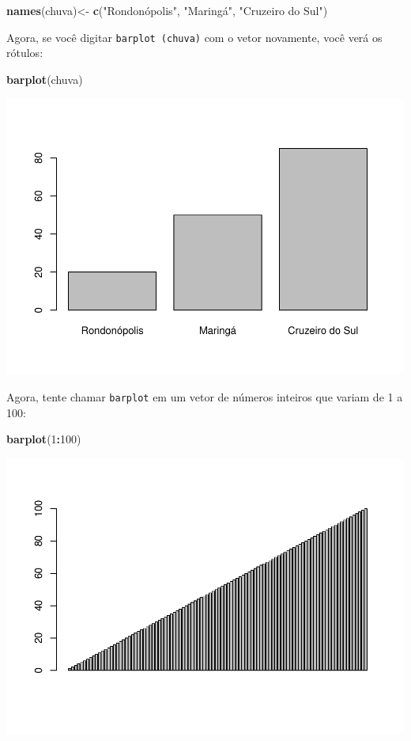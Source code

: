 \documentclass[
]{book}
\newenvironment{Shaded}{\begin{snugshade}}{\end{snugshade}}
\newcommand{\DecValTok}[1]{\textcolor[rgb]{0.00,0.00,0.81}{#1}}
\newcommand{\KeywordTok}[1]{\textcolor[rgb]{0.13,0.29,0.53}{\textbf{#1}}}
\newcommand{\NormalTok}[1]{#1}
\newcommand{\OperatorTok}[1]{\textcolor[rgb]{0.81,0.36,0.00}{\textbf{#1}}}
\newcommand{\StringTok}[1]{\textcolor[rgb]{0.31,0.60,0.02}{#1}}
\begin{document}
\begin{Shaded}
\begin{Highlighting}[]
\KeywordTok{names}\NormalTok{(chuva)<-}\StringTok{ }\KeywordTok{c}\NormalTok{(}\StringTok{"Rondonópolis", "}\NormalTok{Maringá}\StringTok{", "}\NormalTok{Cruzeiro do Sul}\StringTok{")}
\end{Highlighting}
\end{Shaded}

Agora, se você digitar \texttt{barplot\ (chuva)} com o vetor novamente, você verá os rótulos:

\begin{Shaded}
\begin{Highlighting}[]
\KeywordTok{barplot}\NormalTok{(chuva)}
\end{Highlighting}
\end{Shaded}

\includegraphics{TudodoR_files/figure-latex/unnamed-chunk-34-1.pdf}

Agora, tente chamar \texttt{barplot} em um vetor de números inteiros que variam de 1 a 100:

\begin{Shaded}
\begin{Highlighting}[]
\KeywordTok{barplot}\NormalTok{(}\DecValTok{1}\OperatorTok{:}\DecValTok{100}\NormalTok{)}
\end{Highlighting}
\end{Shaded}

\includegraphics{TudodoR_files/figure-latex/unnamed-chunk-35-1.pdf}
\end{document}
